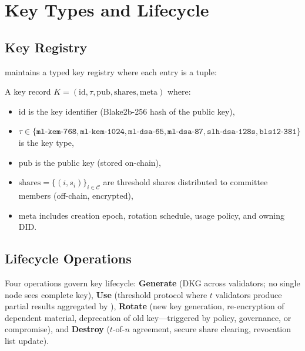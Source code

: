 \section{Key Types and Lifecycle}


\subsection{Key Registry}

\KeyVM{} maintains a typed key registry where each entry is a tuple:

\begin{definition}
A key record $K = (\text{id}, \tau, \text{pub}, \text{shares}, \text{meta})$ where:
\begin{itemize}
\item $\text{id}$ is the key identifier (Blake2b-256 hash of the public key),
\item $\tau \in \{\texttt{ml-kem-768}, \texttt{ml-kem-1024}, \texttt{ml-dsa-65}, \texttt{ml-dsa-87}, \texttt{slh-dsa-128s}, \texttt{bls12-381}\}$ is the key type,
\item $\text{pub}$ is the public key (stored on-chain),
\item $\text{shares} = \{(i, s_i)\}_{i \in \mathcal{C}}$ are threshold shares distributed to committee members (off-chain, encrypted),
\item $\text{meta}$ includes creation epoch, rotation schedule, usage policy, and owning DID.
\end{itemize}
\end{definition}

\subsection{Lifecycle Operations}

Four operations govern key lifecycle: \textbf{Generate} (DKG across validators; no single node sees complete key), \textbf{Use} (threshold protocol where $t$ validators produce partial results aggregated by \KeyVM{}), \textbf{Rotate} (new key generation, re-encryption of dependent material, deprecation of old key---triggered by policy, governance, or compromise), and \textbf{Destroy} ($t$-of-$n$ agreement, secure share clearing, revocation list update).

